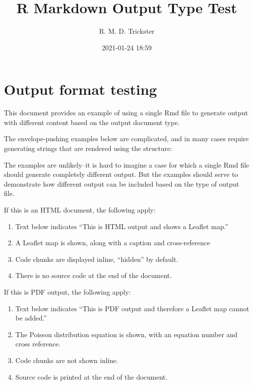 \documentclass[
]{article}
\title{R Markdown Output Type Test}
\author{R. M. D. Trickster}
\date{2021-01-24 18:59}
\providecommand{\tightlist}{%
  \setlength{\itemsep}{0pt}\setlength{\parskip}{0pt}}
\begin{document}
\maketitle

{
\setcounter{tocdepth}{2}
\tableofcontents
}
\hypertarget{output-format-testing}{%
\section{Output format testing}\label{output-format-testing}}

This document provides an example of using a single Rmd file to generate output with different content based on the output document type.

The envelope-pushing examples below are complicated, and in many cases require generating strings that are rendered using the structure:

The examples are unlikely--it is hard to imagine a case for which a single Rmd file should generate completely different output. But the examples should serve to demonstrate how different output can be included based on the type of output file.

If this is an HTML document, the following apply:

\begin{enumerate}
\def\labelenumi{\arabic{enumi}.}
\tightlist
\item
  Text below indicates ``This is HTML output and shows a Leaflet map.''
\item
  A Leaflet map is shown, along with a caption and cross-reference
\item
  Code chunks are displayed inline, ``hidden'' by default.
\item
  There is no source code at the end of the document.
\end{enumerate}

If this is PDF output, the following apply:

\begin{enumerate}
\def\labelenumi{\arabic{enumi}.}
\tightlist
\item
  Text below indicates ``This is PDF output and therefore a Leaflet map cannot be added.''
\item
  The Poisson distribution equation is shown, with an equation number and cross reference.
\item
  Code chunks are not shown inline.
\item
  Source code is printed at the end of the document.
\end{enumerate}
\end{document}
